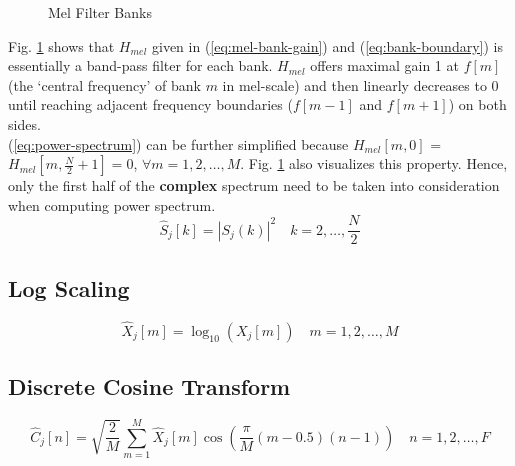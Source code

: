 \begin{figure}[H]
\centering
{}
\caption{Mel Filter Banks}
\label{mel_triangle}
\end{figure}

Fig. \ref{mel_triangle} shows that $H_{mel}$ given in (\ref{eq:mel-bank-gain}) and (\ref{eq:bank-boundary}) is essentially a band-pass filter for each bank. $H_{mel}$ offers maximal gain 1 at $f[m]$ (the `central frequency' of bank $m$ in mel-scale) and then linearly decreases to 0 until reaching adjacent frequency boundaries ($f[m-1]$ and $f[m+1]$) on both sides.\\

(\ref{eq:power-spectrum}) can be further simplified because $H_{mel}[m, 0]$ = $H_{mel}[m, \frac{N}{2}+1] = 0$, $\forall m = 1, 2, \dots, M$. Fig. \ref{mel_triangle} also visualizes this property. Hence, only the first half of the \textbf{complex} spectrum need to be taken into consideration when computing power spectrum.
\begin{equation}
\hat{S}_j[k] = |S_j(k)|^2 \quad k = 2, \dots, \frac{N}{2}
\end{equation}


\subsection{Log Scaling}

\begin{equation}
\label{eq:log-scaling}
\hat{X}_j[m] = \log_{10}(X_j[m]) \quad m = 1, 2, \dots, M
\end{equation}


\subsection{Discrete Cosine Transform}

\begin{equation}
\label{eq:dct}
\hat{C}_j[n] = \sqrt{\frac{2}{M}} \sum^{M}_{m=1} \hat{X}_j[m] \cos \left( \frac{\pi}{M} (m - 0.5) (n-1) \right) \quad n = 1, 2, \dots, F
\end{equation}
